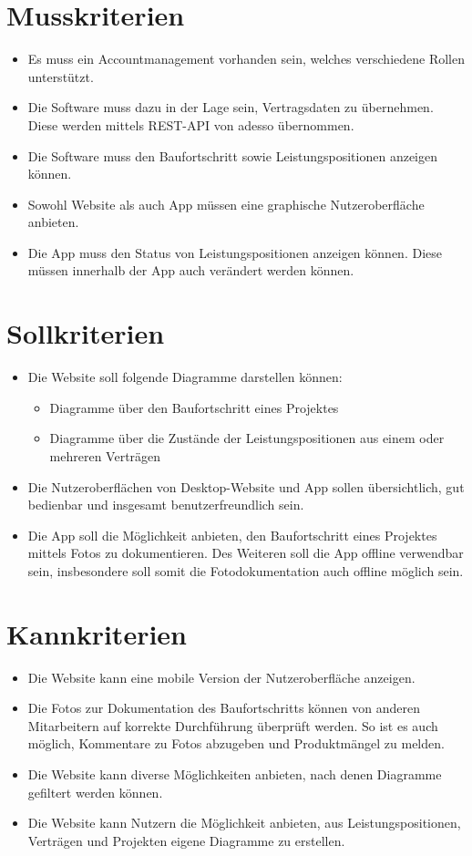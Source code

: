 \section{Musskriterien}
\begin{itemize}
	\item Es muss ein Accountmanagement vorhanden sein, welches verschiedene Rollen unterstützt.
	\item Die Software muss dazu in der Lage sein, Vertragsdaten zu übernehmen. Diese werden mittels REST-API von adesso übernommen.
	\item Die Software muss den Baufortschritt sowie Leistungspositionen anzeigen können.
	\item Sowohl Website als auch App müssen eine graphische Nutzeroberfläche anbieten.
	\item Die App muss den Status von Leistungspositionen anzeigen können.
	Diese müssen innerhalb der App auch verändert werden können.
\end{itemize}

\section{Sollkriterien}
\begin{itemize}
	\item Die Website soll folgende Diagramme darstellen können:
		\begin{itemize}
		\item Diagramme über den Baufortschritt eines Projektes
		\item Diagramme über die Zustände der Leistungspositionen aus einem oder mehreren Verträgen
		\end{itemize}
	\item Die Nutzeroberflächen von Desktop-Website und App sollen übersichtlich, gut bedienbar und insgesamt benutzerfreundlich sein.
	\item Die App soll die Möglichkeit anbieten, den Baufortschritt eines Projektes mittels Fotos zu dokumentieren.
	Des Weiteren soll die App offline verwendbar sein, insbesondere soll somit die Fotodokumentation auch offline möglich sein.
\end{itemize}

\section{Kannkriterien}
\begin{itemize}
	\item Die Website kann eine mobile Version der Nutzeroberfläche anzeigen.
	\item Die Fotos zur Dokumentation des Baufortschritts können von anderen Mitarbeitern auf korrekte Durchführung überprüft werden.
	So ist es auch möglich, Kommentare zu Fotos abzugeben und Produktmängel zu melden.
	\item Die Website kann diverse Möglichkeiten anbieten, nach denen Diagramme gefiltert werden können.
	\item Die Website kann Nutzern die Möglichkeit anbieten, aus Leistungspositionen, Verträgen und Projekten eigene Diagramme zu erstellen.
\end{itemize}

